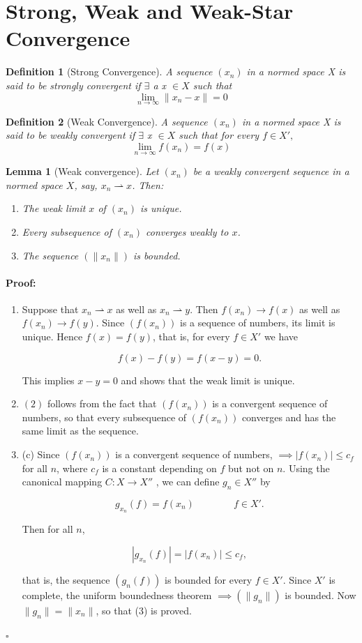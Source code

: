\documentclass{article}
\newenvironment{proof}{\paragraph{Proof:}}{\hfill$\square$}
\newtheorem{definition}{Definition}[section]
\newtheorem{lemma}{Lemma}[section]
\begin{document}
\section{Strong, Weak and Weak-Star Convergence}
\begin{definition}[Strong Convergence]
    A sequence $(x_n)$ in a normed space X is said to be strongly convergent if $\exists$ a x $\in X$ such that \[\lim_{n \to \infty} \| x_n - x \| = 0  \]
\end{definition}
\begin{definition}[Weak Convergence]
    A sequence $(x_n)$ in a normed space X is said to be weakly convergent if $\exists$ x $\in X $ such that for every $f \in X',$\[ \lim_{n \to \infty } f(x_n) = f(x)    \]

\end{definition}
\begin{lemma}[Weak convergence]
Let $(x_n)$ be a weakly convergent sequence in a normed space $X$, say, $x_n \rightharpoonup x$. Then:

\begin{enumerate}
\item The weak limit $x$ of $(x_n)$ is unique.
\item Every subsequence of $(x_n)$ converges weakly to $x$.
\item The sequence $(\|x_n\|)$ is bounded.
\end{enumerate}
\end{lemma}
\begin{proof}
\begin{enumerate}
\item Suppose that $x_n \rightharpoonup x$ as well as $x_n \rightharpoonup y$. Then $f(x_n) \to f(x)$ as well as $f(x_n) \to f(y)$. Since $(f(x_n))$ is a sequence of numbers, its limit is unique. Hence $f(x) = f(y)$, that is, for every $f \in X'$ we have

\[f(x) - f(y) = f(x - y) = 0.\]

This implies $x - y = 0$ and shows that the weak limit is unique.

\item $(2)$ follows from the fact that $(f(x_n))$ is a convergent sequence of numbers, so that every subsequence of $(f(x_n))$ converges and has the same limit as the sequence.
\item (c) Since $(f(x_n))$ is a convergent sequence of numbers,  $ \implies |f(x_n)| \leq c_f$ for all $n$, where $c_f$ is a constant depending on $f$ but not on $n$. Using the canonical mapping $C: X \to X''$ , we can define $g_n \in X''$ by

\[g_{x_n}(f) = f(x_n) \qquad \qquad f \in X'.\]

 Then for all $n$,

\[|g_{x_n}(f)| = |f(x_n)| \leq c_f,\]

that is, the sequence $(g_n(f))$ is bounded for every $f \in X'$. Since $X'$ is complete, the uniform boundedness theorem $ \implies (\|g_n\|)$ is bounded. Now $\|g_n\| = \|x_n\|$, so that (3) is proved.
\end{enumerate}
\end{proof}
\end{document}
